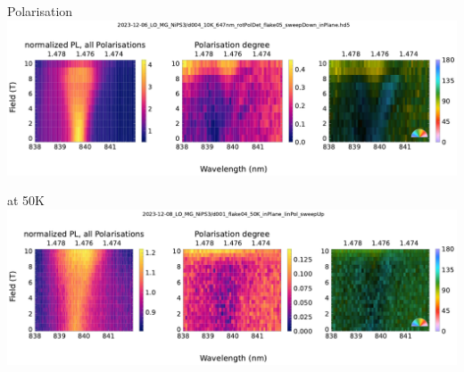 \begin{frame}{Polarisation}
	\centering
	\includegraphics{../figures/2023-12-10 splitting polarisation on 2023-12-06_LO_MG_NiPS3 d004_10K_647nm_rotPolDet_flake05_sweepDown_inPlane.hd5.pdf}
\end{frame}
\begin{frame}{at 50K}
	\centering
	\includegraphics{../figures/2023-12-10 splitting polarisation on 2023-12-08_LO_MG_NiPS3 d001_flake04_50K_inPlane_linPol_sweepUp.pdf}
\end{frame}

